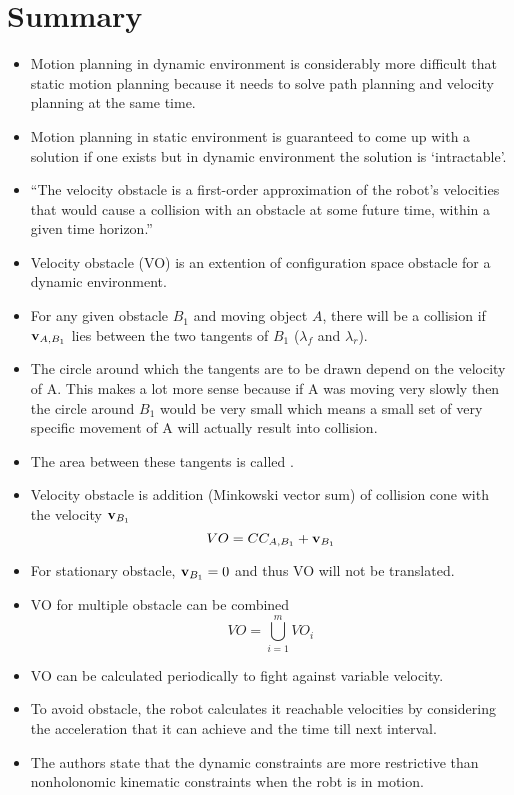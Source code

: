 \documentclass[12pt]{article}
\begin{document}
\section{Summary}
\begin{itemize}
    \item Motion planning in dynamic environment is considerably more difficult that static motion planning because it needs to solve path planning and velocity planning at the same time.
    \item Motion planning in static environment is guaranteed to come up with a solution if one exists but in dynamic environment the solution is `intractable'.
    \item ``The velocity obstacle is a first-order approximation of the robot’s velocities that would cause a collision with an obstacle at some future time, within a given time horizon.''\cite{fiorini}
    \item Velocity obstacle (VO) is an extention of configuration space obstacle for a dynamic environment.
    \item For any given obstacle $B_1$ and moving object $A$, there will be a collision if $\bold{v}_{A,B_1}$ lies between the two tangents of $B_1$ ($\lambda_f$ and $\lambda_r$).
    \item The circle around which the tangents are to be drawn depend on the velocity of A. This makes a lot more sense because if A was moving very slowly then the circle around $B_1$ would be very small which means a small set of very specific movement of A will actually result into collision.
    \item The area between these tangents is called .
    \item Velocity obstacle is addition (Minkowski vector sum) of collision cone with the velocity $\bold{v}_{B_1}$ $$VO = CC_{A,B_1} + \bold{v}_{B_1}$$
    \item For stationary obstacle, $\bold{v}_{B_1} = 0$ and thus VO will not be translated.
    \item VO for multiple obstacle can be combined $$VO = \bigcup^{m}_{i=1}VO_i$$
    \item VO can be calculated periodically to fight against variable velocity.
    \item To avoid obstacle, the robot calculates it reachable velocities by considering the acceleration that it can achieve and the time till next interval.
    \item The authors state that the dynamic constraints are more restrictive than nonholonomic kinematic constraints when the robt is in motion.

\end{itemize}
\end{document}

